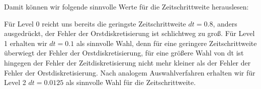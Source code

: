 Damit können wir folgende sinnvolle Werte für die Zeitschrittweite herauslesen:
\begin{figure}[H]
	\centering
\end{figure}
Für Level 0  reicht uns bereits die geringste Zeitschrittweite $dt = 0.8$, anders ausgedrückt, der Fehler der Orstdiskretisierung ist schlichtweg zu groß. Für Level 1 erhalten wir $dt= 0.1$ als sinnvolle Wahl, denn für eine geringere Zeitschrittweite überwiegt der Fehler der Orstdiskretisierung, für eine größere Wahl von dt ist hingegen der Fehler der Zeitdiskretisierung nicht mehr kleiner als der Fehler der Fehler der Orstdiskretisierung.
Nach analogem Auswahlverfahren erhalten wir für Level 2 $dt = 0.0125$ als sinnvolle Wahl für die Zeitschrittweite.





